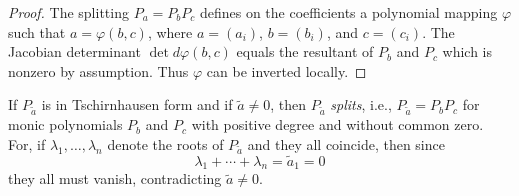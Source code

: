 \documentclass[12pt]{amsart}
\theoremstyle{plain}
\theoremstyle{definition}
\numberwithin{equation}{section}
\begin{document}
\begin{proof}
The splitting $P_a = P_b P_c$ defines on the coefficients a polynomial mapping ${\varphi}$ such that $a = {\varphi}(b,c)$, 
where $a=(a_i)$, $b=(b_i)$, and $c=(c_i)$. The Jacobian determinant  
$\det d{\varphi}(b,c)$ equals the resultant of $P_b$ and $P_c$ which is nonzero by assumption. 
Thus ${\varphi}$ can be inverted locally. 
\end{proof}

If $P_{\tilde a}$ is in Tschirnhausen form and if $\tilde a \ne 0$, then $P_{\tilde a}$ \emph{splits}, i.e., 
$P_{\tilde a} = P_b P_c$ for monic polynomials $P_b$ and $P_c$ with positive degree and without common zero. 
For, if ${\lambda}_1,\ldots,{\lambda}_n$ denote the roots of $P_{\tilde a}$ and they all coincide, then since 
\[
    {\lambda}_1+\cdots+{\lambda}_n = \tilde a_1 = 0
\] 
they all must vanish, contradicting $\tilde a \ne 0$.
\end{document}

